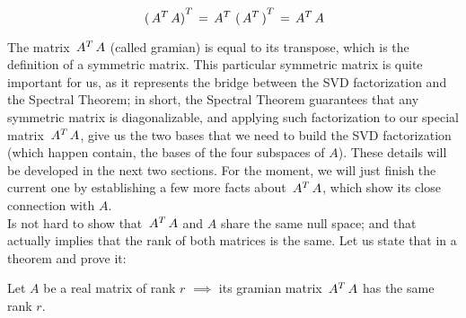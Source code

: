 \[
\,{(\,{A}^{T}\,A)}^{T}\, = \,{A}^{T}\,\,{(\,{A}^{T}\,)}^{T}\, = \,{A}^{T}\,A
\]
\hfill

The matrix $\,{A}^{T}\,A$ (called gramian) is equal to its transpose, which is the
definition of a symmetric matrix. This particular symmetric matrix
is quite important for us, as it represents the bridge between the SVD
factorization and the Spectral Theorem; in short, the Spectral Theorem
guarantees that any symmetric matrix is diagonalizable, and applying such
factorization to our special matrix $\,{A}^{T}\,A$, give us the two bases
that we need to build the SVD factorization (which happen contain, the
bases of the four subspaces of $A$). These details will be developed in
the next two sections. For the moment, we will just finish the current one
by establishing a few more facts about $\,{A}^{T}\,A$, which
show its close connection with $A$. \\

Is not hard to show that $\,{A}^{T}\,A$ and $A$ share the same null
space; and that actually implies that the rank of both matrices is
the same. Let us state that in a theorem and prove it:

\begin{theorem}
\label{thm:gramr}
Let $A$ be a real matrix of rank $r$ $\implies$ its gramian matrix
$\,{A}^{T}\,A$ has the same rank $r$.
\end{theorem}
\hfill


